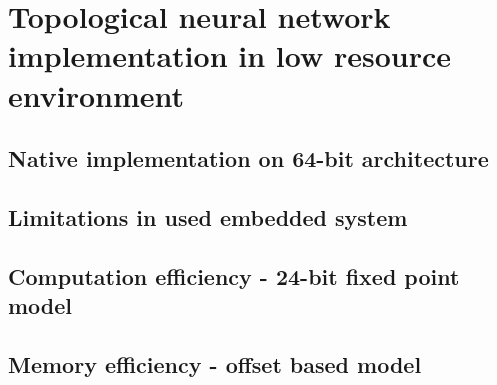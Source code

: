 \FloatBarrier
\section{Topological neural network implementation in low resource environment}

\FloatBarrier
\subsection{Native implementation on 64-bit architecture}

\FloatBarrier
\subsection{Limitations in used embedded system}

\FloatBarrier
\subsection{Computation efficiency - 24-bit fixed point model}

\FloatBarrier
\subsection{Memory efficiency - offset based model}
